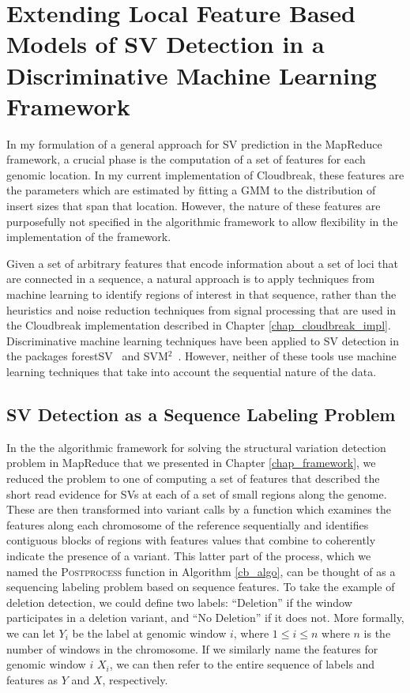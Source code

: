 \chapter{Extending Local Feature Based Models of SV Detection in a Discriminative Machine Learning Framework}\label{chap_crf}

In my formulation of a general approach for SV prediction in the MapReduce framework, a crucial phase is the computation of a set of features for each genomic location. In my current implementation of Cloudbreak, these features are the parameters which are estimated by fitting a GMM to the distribution of insert sizes that span that location. However, the nature of these features are purposefully not specified in the algorithmic framework to allow flexibility in the implementation of the framework.

Given a set of arbitrary features that encode information about a set of loci that are connected in a sequence, a natural approach is to apply techniques from machine learning to identify regions of interest in that sequence, rather than the heuristics and noise reduction techniques from signal processing that are used in the Cloudbreak implementation described in Chapter \ref{chap_cloudbreak_impl}. Discriminative machine learning techniques have been applied to SV detection in the packages forestSV~\cite{Michaelson:2012fj} and SVM$^2$~\cite{Chiara:2012ey}. However, neither of these tools use machine learning techniques that take into account the sequential nature of the data. 

\section{SV Detection as a Sequence Labeling Problem}

In the the algorithmic framework for solving the structural variation detection problem in MapReduce that we presented in Chapter \ref{chap_framework}, we reduced the problem to one of computing a set of features that described the short read evidence for SVs at each of a set of small regions along the genome. These are then transformed into variant calls by a function which examines the features along each chromosome of the reference sequentially and identifies contiguous blocks of regions with features values that combine to coherently indicate the presence of a variant. This latter part of the process, which we named the \textsc{Postprocess} function in Algorithm \ref{cb_algo}, can be thought of as a sequencing labeling problem based on sequence features. To take the example of deletion detection, we could define two labels: ``Deletion'' if the window participates in a deletion variant, and ``No Deletion'' if it does not. More formally, we can let $Y_i$ be the label at genomic window $i$, where $1 \le i \le n$ where $n$ is the number of windows in the chromosome. If we similarly name the features for genomic window $i$ $X_i$, we can then refer to the entire sequence of labels and features as $Y$ and $X$, respectively.

